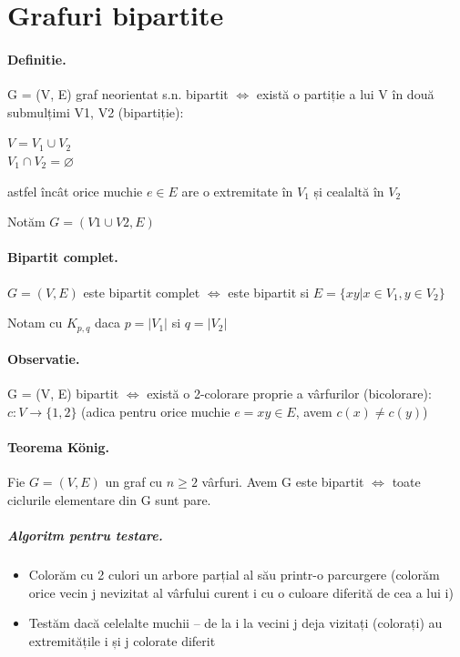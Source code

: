 \documentclass{article}
\begin{document}
\section{Grafuri bipartite}
\paragraph*{Definitie.}G = (V, E) graf neorientat s.n. bipartit $\Leftrightarrow$ există o partiție a lui V în două submulțimi V1, V2 (bipartiție):
\begin{center}
    $V = V_1 \cup V_2$\\
    $V_1 \cap V_2 = \varnothing$
\end{center}
astfel încât orice muchie $e \in E$ are o extremitate în $V_1$ și cealaltă în $V_2$
\begin{center}
    Notăm $G = (V1 \cup V2, E)$
\end{center}
\paragraph*{Bipartit complet.} $G=(V,E)$ este bipartit complet $\Leftrightarrow$ este bipartit si $E=\{xy | x \in V_1, y \in V_2 \}$
\begin{center}
    Notam cu $K_{p,q}$ daca $p = |V_1|$ si $q = |V_2|$
\end{center}

\paragraph*{Observatie.} G = (V, E) bipartit $\Leftrightarrow$ există o 2-colorare proprie a vârfurilor (bicolorare): $c:V \rightarrow \{1,2\}$ (adica pentru orice muchie $e = xy \in E$, avem $c(x) \neq c(y)$)

\paragraph*{Teorema König.} Fie $G = (V, E)$ un graf cu $n \geq 2$ vârfuri. Avem G este bipartit $\Leftrightarrow$ toate ciclurile elementare din G sunt pare.
\subparagraph*{Algoritm pentru testare.} 
\begin{itemize}
    \item Colorăm cu 2 culori un arbore parțial al său printr-o parcurgere (colorăm orice vecin j nevizitat al vârfului curent i cu o culoare
    diferită de cea a lui i)
    \item Testăm dacă celelalte muchii – de la i la vecini j deja vizitați (colorați) au extremitățile i și j colorate diferit
\end{itemize}
\end{document}
